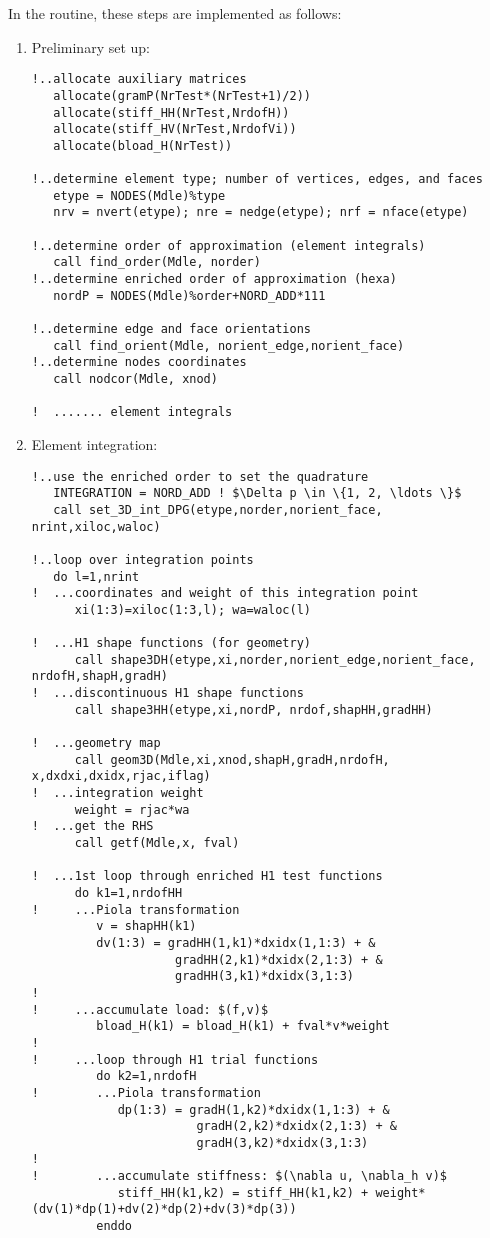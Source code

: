 In the  routine, these steps are implemented as follows:
\begin{enumerate}
	\item{ Preliminary set up:
\begin{lstlisting}[mathescape,caption=\file{POISSON/PRIMAL\_DPG/}\routine{elem}: preliminary set up]
!..allocate auxiliary matrices
   allocate(gramP(NrTest*(NrTest+1)/2))
   allocate(stiff_HH(NrTest,NrdofH))
   allocate(stiff_HV(NrTest,NrdofVi))
   allocate(bload_H(NrTest))

!..determine element type; number of vertices, edges, and faces
   etype = NODES(Mdle)%type
   nrv = nvert(etype); nre = nedge(etype); nrf = nface(etype)
   
!..determine order of approximation (element integrals)
   call find_order(Mdle, norder)
!..determine enriched order of approximation (hexa)
   nordP = NODES(Mdle)%order+NORD_ADD*111

!..determine edge and face orientations
   call find_orient(Mdle, norient_edge,norient_face)
!..determine nodes coordinates
   call nodcor(Mdle, xnod)
   
!  ....... element integrals
\end{lstlisting}
	}
	\item{ Element integration:
\begin{lstlisting}[mathescape,caption=\file{POISSON/PRIMAL\_DPG/}\routine{elem}: element integration]
!..use the enriched order to set the quadrature
   INTEGRATION = NORD_ADD ! $\Delta p \in \{1, 2, \ldots \}$
   call set_3D_int_DPG(etype,norder,norient_face, nrint,xiloc,waloc)

!..loop over integration points
   do l=1,nrint
!  ...coordinates and weight of this integration point
      xi(1:3)=xiloc(1:3,l); wa=waloc(l)

!  ...H1 shape functions (for geometry)
      call shape3DH(etype,xi,norder,norient_edge,norient_face, nrdofH,shapH,gradH)
!  ...discontinuous H1 shape functions
      call shape3HH(etype,xi,nordP, nrdof,shapHH,gradHH)

!  ...geometry map
      call geom3D(Mdle,xi,xnod,shapH,gradH,nrdofH, x,dxdxi,dxidx,rjac,iflag)
!  ...integration weight
      weight = rjac*wa
!  ...get the RHS
      call getf(Mdle,x, fval)

!  ...1st loop through enriched H1 test functions
      do k1=1,nrdofHH
!     ...Piola transformation
         v = shapHH(k1)
         dv(1:3) = gradHH(1,k1)*dxidx(1,1:3) + &
                    gradHH(2,k1)*dxidx(2,1:3) + &
                    gradHH(3,k1)*dxidx(3,1:3)
!
!     ...accumulate load: $(f,v)$
         bload_H(k1) = bload_H(k1) + fval*v*weight
!
!     ...loop through H1 trial functions
         do k2=1,nrdofH
!        ...Piola transformation
            dp(1:3) = gradH(1,k2)*dxidx(1,1:3) + &
                       gradH(2,k2)*dxidx(2,1:3) + &
                       gradH(3,k2)*dxidx(3,1:3)
!
!        ...accumulate stiffness: $(\nabla u, \nabla_h v)$
            stiff_HH(k1,k2) = stiff_HH(k1,k2) + weight*(dv(1)*dp(1)+dv(2)*dp(2)+dv(3)*dp(3))
         enddo


\end{lstlisting}}
\end{enumerate}
